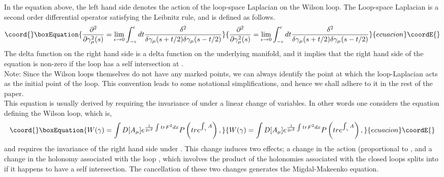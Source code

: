 \documentclass[a4paper,12]{article}
\begin{document}
In the equation above, the left hand side denotes the action of the 
loop-space Laplacian on the
Wilson loop. The Loop-space Laplacian \cite{Polyakov:glue, 
loopharmonic} is a second 
order differential
operator satisfying the Leibnitz rule, and is defined as follows.
\begin{equation}\coord{}\boxEquation{
\frac{\partial ^2}{\partial \gamma _\mu ^2 (s)} = \lim_{\epsilon \rightarrow 0}\int
_{-\epsilon }^{\epsilon }dt\frac{\delta ^2 }{\delta \gamma _\mu
(s + t/2)\delta \gamma _\mu (s - t/2)}
}{
\frac{\partial ^2}{\partial \gamma _\mu ^2 (s)} = \lim_{\epsilon \rightarrow 0}\int
_{-\epsilon }^{\epsilon }dt\frac{\delta ^2 }{\delta \gamma _\mu
(s + t/2)\delta \gamma _\mu (s - t/2)}
}{ecuacion}\coordE{}\end{equation}
The delta function on the right hand side is a
delta function on the underlying manifold, and it implies that the right
hand side of the equation is non-zero if the loop has a self intersection
at \coordHE{}. \\

Note: Since the Wilson loops themselves do not have any marked points, we 
can always identify the point at which the loop-Laplacian acts as the 
initial point of the loop. This convention leads to some notational 
simplifications, and hence we shall adhere to it in the rest of the 
paper.\\


This equation is usually derived by requiring the invariance of \coordHE{} under a linear change of variables. In other words one considers the   
equation defining the Wilson loop, which is,
\begin{equation}\coord{}\boxEquation{
W(\gamma ) = \int D[A_\mu ] e^{\frac{1}{2e^2}\int tr F^2
dx}P\left(tre^{\int_{\gamma }A}\right),
}{
W(\gamma ) = \int D[A_\mu ] e^{\frac{1}{2e^2}\int tr F^2
dx}P\left(tre^{\int_{\gamma }A}\right),
}{ecuacion}\coordE{}\end{equation}
and  requires the invariance of the right hand side under \coordHE{}. This change induces two effects; a
change in the action (proportional to \coordHE{}, and a   
change in the holonomy associated with the loop \myHighlight{$\gamma $}\coordHE{}, which involves 
the product of the holonomies associated with the closed loops \myHighlight{$\gamma $}\coordHE{}  
splits into if it happens to have a self intersection. The cancellation of
these two changes generates the Migdal-Makeenko equation.\\
\end{document}

